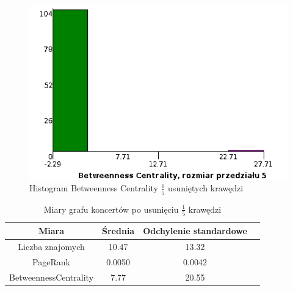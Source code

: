 \documentclass[10pt,a4paper]{article}
\begin{document}
\begin{figure}[H]
\centering
\caption{Histogram Betweenness Centrality $\frac{1}{5}$ usuniętych krawędzi}
\includegraphics[scale=0.6]{wyniki/final200Events/1200eventsBCHist.png}
\end{figure}


\begin{table}[H]
  \caption{Miary grafu koncertów po usunięciu $\frac{1}{5}$ krawędzi}
  \centering
    \begin{tabular}{cccc}
    \addlinespace
    \toprule
    Miara & Średnia  & Odchylenie standardowe \\
    \midrule
    Liczba znajomych & 10.47 & 13.32 \\
    PageRank & 0.0050 & 0.0042 \\
    BetweennessCentrality & 7.77 & 20.55\\ 
    \bottomrule
    \end{tabular}
  \label{tab:frsum31}
\end{table}
\end{document}
